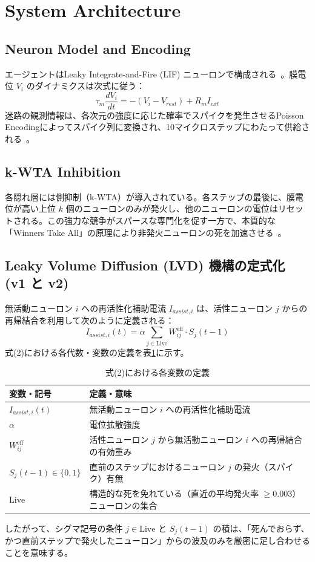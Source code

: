 \documentclass[submit]{ipsj}
\begin{document}
\section{System Architecture}
\subsection{Neuron Model and Encoding}
エージェントはLeaky Integrate-and-Fire (LIF) ニューロンで構成される~\cite{abbott1999lapicque}。膜電位 $V_i$ のダイナミクスは次式に従う：
\begin{equation}
\tau_m \frac{dV_i}{dt} = -(V_i - V_{rest}) + R_m I_{ext}
\end{equation}
迷路の観測情報は、各次元の強度に応じた確率でスパイクを発生させるPoisson Encodingによってスパイク列に変換され、10マイクロステップにわたって供給される~\cite{10.1371/journal.pcbi.0030031}。

\subsection{k-WTA Inhibition}
各隠れ層には側抑制（k-WTA）が導入されている。各ステップの最後に、膜電位が高い上位 $k$ 個のニューロンのみが発火し、他のニューロンの電位はリセットされる。この強力な競争がスパースな専門化を促す一方で、本質的な「Winners Take All」の原理により非発火ニューロンの死を加速させる~\cite{oster2009winner}。

\subsection{Leaky Volume Diffusion (LVD) 機構の定式化 (v1 と v2)}
無活動ニューロン $i$ への再活性化補助電流 $I_{assist,i}$ は、活性ニューロン $j$ からの再帰結合を利用して次のように定義される：
\begin{equation}
I_{assist,i}(t) = \alpha \sum_{j \in \text{Live}} W_{ij}^{\text{eff}} \cdot S_j(t-1)
\end{equation}
式(2)における各代数・変数の定義を表\ref{tab:variables}に示す。
\begin{table}[htbp]
\centering
\caption{式(2)における各変数の定義}
\label{tab:variables}
\begin{tabular}{lp{4.5cm}}
\toprule
変数・記号 & 定義・意味 \\ \midrule
$I_{assist,i}(t)$ & 無活動ニューロン $i$ への再活性化補助電流 \\
$\alpha$ & 電位拡散強度 \\
$W_{ij}^{\text{eff}}$ & 活性ニューロン $j$ から無活動ニューロン $i$ への再帰結合の有効重み \\
$S_j(t-1) \in \{0,1\}$ & 直前のステップにおけるニューロン $j$ の発火（スパイク）有無 \\
$\text{Live}$ & 構造的な死を免れている（直近の平均発火率 $\ge 0.003$）ニューロンの集合 \\ \bottomrule
\end{tabular}
\end{table}
したがって、シグマ記号の条件 $j \in \text{Live}$ と $S_j(t-1)$ の積は、「死んでおらず、かつ直前ステップで発火したニューロン」からの波及のみを厳密に足し合わせることを意味する。
\end{document}
